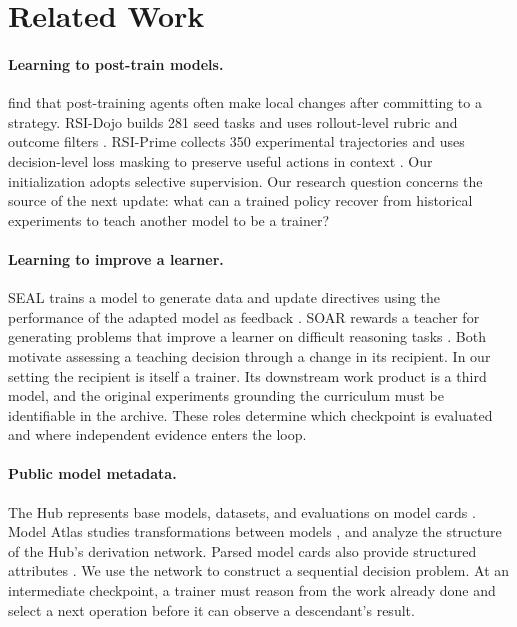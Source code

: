\documentclass{article}
\begin{document}
\section{Related Work}

\paragraph{Learning to post-train models.}
\citet{lim2026missing} find that post-training agents often make local changes after committing to a strategy. RSI-Dojo builds 281 seed tasks and uses rollout-level rubric and outcome filters \citep{gao2026rsidojo}. RSI-Prime collects 350 experimental trajectories and uses decision-level loss masking to preserve useful actions in context \citep{zheng2026rsiprime}. Our initialization adopts selective supervision. Our research question concerns the source of the next update: what can a trained policy recover from historical experiments to teach another model to be a trainer?

\paragraph{Learning to improve a learner.}
SEAL trains a model to generate data and update directives using the performance of the adapted model as feedback \citep{zweiger2025seal}. SOAR rewards a teacher for generating problems that improve a learner on difficult reasoning tasks \citep{sundaram2026soar}. Both motivate assessing a teaching decision through a change in its recipient. In our setting the recipient is itself a trainer. Its downstream work product is a third model, and the original experiments grounding the curriculum must be identifiable in the archive. These roles determine which checkpoint is evaluated and where independent evidence enters the loop.

\paragraph{Public model metadata.}
The Hub represents base models, datasets, and evaluations on model cards \citep{huggingfacehubcards}. Model Atlas studies transformations between models \citep{horwitz2025atlas}, and \citet{laufer2025anatomy} analyze the structure of the Hub's derivation network. Parsed model cards also provide structured attributes \citep{vanstrien2025parsed}. We use the network to construct a sequential decision problem. At an intermediate checkpoint, a trainer must reason from the work already done and select a next operation before it can observe a descendant's result.
\end{document}
